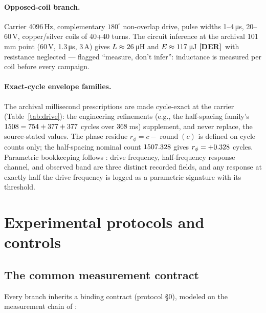 \documentclass[10pt,letterpaper]{article}
\newcommand{\cltag}[2]{\textcolor{#1}{{\fontspec{TeX Gyre Heros}\scriptsize\bfseries[#2]}}}
\newcommand{\DER}{\cltag{dercol}{DER}}   %
\begin{document}
\paragraph{Opposed-coil branch.} Carrier 4096\,Hz, complementary
$180^\circ$ non-overlap drive, pulse widths 1--4\,\si{\micro s}, 20--60\,V,
copper/silver coils of 40+40 turns. The circuit inference at the archival
101\,mm point (60\,V, 1.3\,\si{\micro s}, 3\,A) gives $L \approx
26$\,\si{\micro H} and $E \approx 117$\,\si{\micro J} \DER\ with
resistance neglected — flagged ``measure, don't infer'': inductance is
measured per coil before every campaign.

\paragraph{Exact-cycle envelope families.} The archival millisecond
prescriptions are made cycle-exact at the carrier
(Table~\ref{tab:drive}): the engineering refinements (e.g., the
half-spacing family's $1508 = 754+377+377$ cycles over
$368$\,ms) supplement, and never replace, the source-stated
values. The phase residue $r_\phi = c - \operatorname{round}(c)$ is defined
on cycle counts only; the half-spacing nominal count $1507.328$ gives
$r_\phi = +0.328$ cycles. Parametric bookkeeping follows
\citet{koster2026}: drive frequency, half-frequency response channel, and
observed band are three distinct recorded fields, and any response at
exactly half the drive frequency is logged as a parametric signature with
its threshold.



\section{Experimental protocols and controls}\label{sec:protocols}

\subsection{The common measurement contract}

Every branch inherits a binding contract (protocol \S0), modeled on the
measurement chain of \citet{koster2026}:
\end{document}
